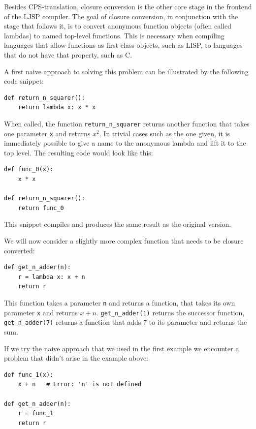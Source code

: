 \documentclass[11pt]{report}
\begin{document}
Besides CPS-translation, closure conversion is the other core stage in the frontend of the LJSP compiler. The goal of closure conversion, in conjunction with the stage that follows it, is to convert anonymous function objects (often called lambdas) to named top-level functions. This is necessary when compiling languages that allow functions as first-class objects, such as LISP, to languages that do not have that property, such as C.

A first naive approach to solving this problem can be illustrated by the following code snippet:

\begin{lstlisting}
def return_n_squarer():
    return lambda x: x * x
\end{lstlisting}

When called, the function \texttt{return_n_squarer} returns another function that takes one parameter \texttt{x} and returns $x^2$. In trivial cases such as the one given, it is immediately possible to give a name to the anonymous lambda and lift it to the top level. The resulting code would look like this:

\begin{lstlisting}
def func_0(x):
    x * x
    
def return_n_squarer():
    return func_0
\end{lstlisting}

This snippet compiles and produces the same result as the original version.

We will now consider a slightly more complex function that needs to be closure converted:

\begin{lstlisting}
def get_n_adder(n):
    r = lambda x: x + n
    return r
\end{lstlisting}

This function takes a parameter \texttt{n} and returns a function, that takes its own parameter \texttt{x} and returns $x+n$. \texttt{get_n_adder(1)} returns the successor function, \texttt{get_n_adder(7)} returns a function that adds $7$ to its parameter and returns the sum.

If we try the naive approach that we used in the first example we encounter a problem that didn't arise in the example above:

\begin{lstlisting}
def func_1(x):
    x + n   # Error: 'n' is not defined
    
def get_n_adder(n):
    r = func_1
    return r
\end{lstlisting}
\end{document}
